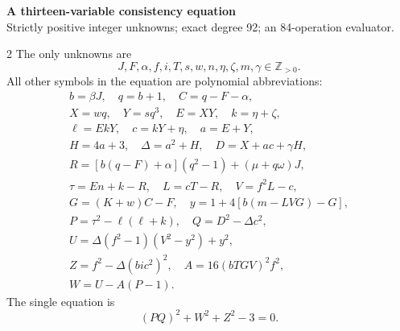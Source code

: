 \documentclass[10pt]{article}
\begin{document}
\begin{center}
{\large\bfseries A thirteen-variable consistency equation}\\[-1pt]
{\small Strictly positive integer unknowns; exact degree 92; an 84-operation evaluator.}
\end{center}\vspace{-8pt}
\begin{multicols}{2}
\fontsize{9}{9.5}\selectfont
The only unknowns are
\[
J,F,\alpha,f,i,T,s,w,n,\eta,\zeta,m,\gamma\in\mathbb Z_{>0}.
\]
All other symbols in the equation are polynomial abbreviations:
\[
\begin{gathered}
b=\beta J,\quad q=b+1,\quad C=q-F-\alpha,\\
X=wq,\quad Y=sq^3,\quad E=XY,\quad k=\eta+\zeta,\\
\ell=EkY,\quad c=kY+\eta,\quad a=E+Y,\\
H=4a+3,\quad\Delta=a^2+H,\quad D=X+ac+\gamma H,\\
R=[b(q-F)+\alpha](q^2-1)+(\mu+q\omega)J,\\
\tau=En+k-R,\quad L=cT-R,\quad V=f^2L-c,\\
G=(K+w)C-F,\quad y=1+4[b(m-LVG)-G],\\
P=\tau^2-\ell(\ell+k),\quad Q=D^2-\Delta c^2,\\
U=\Delta(f^2-1)(V^2-y^2)+y^2,\\
Z=f^2-\Delta(bic^2)^2,\quad A=16(bTGV)^2f^2,\\
W=U-A(P-1).
\end{gathered}
\]
The single equation is
\[
\boxed{(PQ)^2+W^2+Z^2-3=0.}
\]


\end{multicols}
\end{document}
